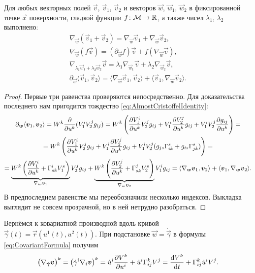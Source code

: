 \begin{proposition} \label{proposition:TranslationProperties}
	Для любых векторных полей $\vec{v}$, $\vec{v}_1$, $\vec{v}_2$ и векторов $\vec{w}$, $\vec{w}_1$, $\vec{w}_2$ в фиксированной точке $\vec{x}$ поверхности, гладкой функции $f\colon \mathcal{M} \to \mathbb{R}$, а также чисел $\lambda_1$, $\lambda_2$ выполнено:
	\begin{gather*}
		\nabla_{\vec{w}}(\vec{v}_1 + \vec{v}_2) = \nabla_{\vec{w}}\vec{v}_1 + \nabla_{\vec{w}}\vec{v}_2,\\
		\nabla_{\vec{w}}(f\vec{v}) = (\partial_{\vec{w}}f)\vec{v} + f(\nabla_{\vec{w}}\vec{v}),\\
		\nabla_{\lambda_1\vec{w}_1 + \lambda_2\vec{w}_2}\vec{v} = \lambda_1\nabla_{\vec{w}_1}\vec{v} + \lambda_2\nabla_{\vec{w}_2}\vec{v},\\
		\partial_{\vec{w}}\langle\vec{v}_1, \vec{v}_2\rangle = \langle\nabla_{\vec{w}}\vec{v}_1, \vec{v}_2\rangle + \langle\vec{v}_1, \nabla_{\vec{w}}\vec{v}_2\rangle.
	\end{gather*}
\end{proposition}

\begin{proof}
	Первые три равенства проверяются непосредственно. Для доказательства последнего нам пригодится тождество \eqref{eq:AlmostCristoffelIdentity}:
	\begin{multline*}
		\partial_{\boldsymbol{w}}\langle\boldsymbol{v}_1, \boldsymbol{v}_2\rangle = W^k\frac{\partial}{\partial u^k}(V_1^iV_2^jg_{ij}) = W^k\left(\frac{\partial V_1^i}{\partial u^k}V_2^jg_{ij} + V_1^i\frac{\partial V_2^j}{\partial u^k}g_{ij} + V_1^iV_2^j\frac{\partial g_{ij}}{\partial u^k}\right) =\\ = W^k\left(\frac{\partial V_1^i}{\partial u^k}V_2^jg_{ij} + V_1^i\frac{\partial V_2^j}{\partial u^k}g_{ij} + V_1^iV_2^j(g_{js}\Gamma_{ik}^s + g_{is}\Gamma_{jk}^s)\right) =\\ = \underbrace{W^k\left(\frac{\partial V_1^i}{\partial u^k} + \Gamma_{sk}^iV_1^s\right)}_{\nabla_{\boldsymbol{w}}\boldsymbol{v}_1}V_2^jg_{ij} + \underbrace{W^k\left(\frac{\partial V_2^j}{\partial u^k} + \Gamma_{sk}^jV_2^s\right)}_{\nabla_{\boldsymbol{w}}\boldsymbol{v}_2}V_1^ig_{ij} = \langle\nabla_{\boldsymbol{w}}\boldsymbol{v}_1, \boldsymbol{v}_2\rangle + \langle\boldsymbol{v}_1, \nabla_{\boldsymbol{w}}\boldsymbol{v}_2\rangle.
	\end{multline*}
	В предпоследнем равенстве мы переобозначили несколько индексов. Выкладка выглядит не совсем прозрачной, но в ней нетрудно разобраться.
\end{proof}

Вернёмся к ковариатной производной вдоль кривой $\vec{\gamma}(t) = \vec{r}(u^1(t), u^2(t))$. При подстановке $\vec{w} = \dot{\vec{\gamma}}$ в формулы \eqref{eq:CovariantFormula} получим
\[
	\big(\nabla_{\dot{\boldsymbol{\gamma}}}\boldsymbol{v}\big)^k = \big(\dot{\gamma}^i\nabla_i\boldsymbol{v}\big)^k = \dot{u}^i\frac{\partial V^k}{\partial u^i} + \dot{u}^i\Gamma_{ij}^kV^j = \frac{\mathop{}\!\mathrm{d} V^k}{\mathop{}\!\mathrm{d} t} + \Gamma_{ij}^k\dot{u}^iV^j.
\]

